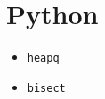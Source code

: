 \section{Python}%
\label{sec:standard-implementations--python}


{\color{red}
\begin{itemize}
    \item \texttt{heapq}
    \item \texttt{bisect}
\end{itemize}
}

